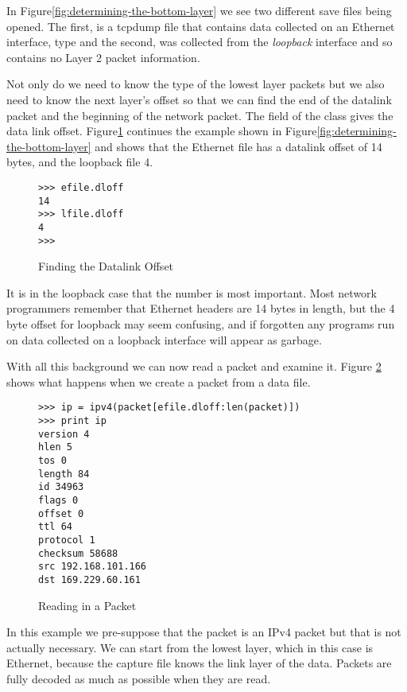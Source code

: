 \documentclass[11pt]{article}
\begin{document}
In Figure\ref{fig:determining-the-bottom-layer} we see two different
save files being opened.  The first,  is a tcpdump
file that contains data collected on an Ethernet interface, type
 and the second,  was collected
from the \emph{loopback} interface and so contains no Layer 2 packet
information.  

Not only do we need to know the type of the lowest layer packets but
we also need to know the next layer's offset so that we can find the
end of the datalink packet and the beginning of the network packet.
The  field of the  class gives the data link
offset.  Figure\ref{fig:finding-the-datalink-offset} continues the
example shown in Figure\ref{fig:determining-the-bottom-layer} and
shows that the Ethernet file has a datalink offset of 14 bytes, and
the loopback file 4. 

  \begin{figure}
    \centering
\begin{lstlisting}
>>> efile.dloff
14
>>> lfile.dloff
4
>>> 
\end{lstlisting}
    \caption{Finding the Datalink Offset}
    \label{fig:finding-the-datalink-offset}
  \end{figure}

It is in the loopback case that the number is most important.  Most
network programmers remember that Ethernet headers are 14 bytes in
length, but the 4 byte offset for loopback may seem confusing, and if
forgotten any programs run on data collected on a loopback interface
will appear as garbage.

With all this background we can now read a packet and examine it.
Figure \ref{fig:reading-in-a-packet} shows what happens when we create
a packet from a data file.  

\begin{figure}
  \centering
\begin{lstlisting}
>>> ip = ipv4(packet[efile.dloff:len(packet)])
>>> print ip
version 4
hlen 5
tos 0
length 84
id 34963
flags 0
offset 0
ttl 64
protocol 1
checksum 58688
src 192.168.101.166
dst 169.229.60.161
\end{lstlisting}
  \caption{Reading in a Packet}
  \label{fig:reading-in-a-packet}
\end{figure}

In this example we pre-suppose that the packet is an IPv4 packet but
that is not actually necessary.  We can start from the lowest layer,
which in this case is Ethernet, because the capture file knows the
link layer of the data.  Packets are fully decoded as much as possible
when they are read.  
\end{document}
